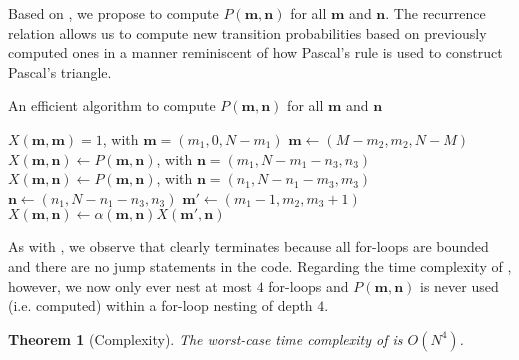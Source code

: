 \documentclass[a4paper,preprint]{elsarticle}
\newtheorem{theorem}{Theorem}
\renewcommand{\vec}[1]{\boldsymbol{#1}}
\begin{document}
Based on , we propose  to compute $P(\vec{m},\vec{n})$ for all $\vec{m}$ and $\vec{n}$. The recurrence relation allows us to compute new transition probabilities based on previously computed ones in a manner reminiscent of how Pascal's rule is used to construct Pascal's triangle.

\begin{algorithm}[t]
    \caption{An efficient algorithm to compute $P(\vec{m},\vec{n})$ for all $\vec{m}$ and $\vec{n}$}
    \label{alg:probs}
    \begin{algorithmic}[1]
            \State $X(\vec{m},\vec{m}) = 1$, with $\vec{m} = (m_1,0,N-m_1)$
        \EndFor
              \State $\vec{m} \gets (M - m_2,m_2,N-M)$
               
                \State $X(\vec{m},\vec{n}) \gets P(\vec{m},\vec{n})$, with $\vec{n}=(m_1,N-m_1-n_3,n_3)$\label{loc:fixn1}
              \EndFor
               
                \State $X(\vec{m},\vec{n}) \gets P(\vec{m},\vec{n})$, with $\vec{n}=(n_1,N-n_1-m_3,m_3)$\label{loc:fixn3}
              \EndFor
              \label{loc:reccomp-start}
                  \label{loc:reccomp-n1}
                     \State $\vec{n} \gets (n_1,N-n_1-n_3,n_3)$
                     \State $\vec{m'} \gets (m_1-1,m_2,m_3+1)$
                     \State $X(\vec{m},\vec{n}) \gets \alpha(\vec{m},\vec{n})X(\vec{m'},\vec{n})$
                  \EndFor
              \EndFor\label{loc:reccomp-end}
          \EndFor
      \EndFor
    \end{algorithmic}
\end{algorithm}

As with , we observe that  clearly terminates because all for-loops are bounded and there are no jump statements in the code. Regarding the time complexity of , however, we now only ever nest at most $4$ for-loops and $P(\vec{m},\vec{n})$ is never used (i.e. computed) within a for-loop nesting of depth $4$.
\begin{theorem}[Complexity]
    The worst-case time complexity of  is $O(N^4)$.
\end{theorem}
\end{document}
